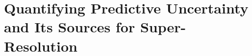 %
%
%
%
%
%
%


\chapter{Quantifying Predictive Uncertainty and Its Sources for Super-Resolution}
\label{chapter:deepuncertainty}


